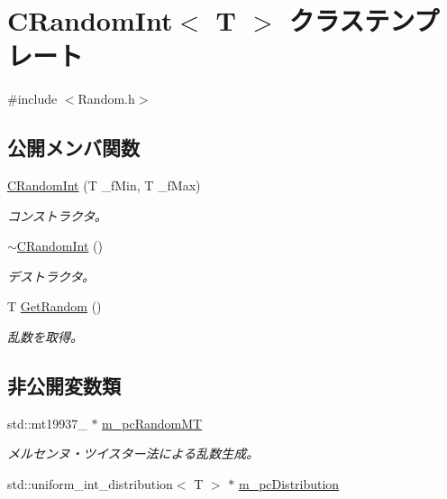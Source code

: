 \hypertarget{class_c_random_int}{}\section{C\+Random\+Int$<$ T $>$ クラステンプレート}
\label{class_c_random_int}


{\ttfamily \#include $<$Random.\+h$>$}

\subsection*{公開メンバ関数}
\begin{DoxyCompactItemize}
\item 
\hyperlink{class_c_random_int_a5f3ff4ea24378926da8aac150a4a33fd}{C\+Random\+Int} (T \+\_\+f\+Min, T \+\_\+f\+Max)
\begin{DoxyCompactList}\small\item\em コンストラクタ。 \end{DoxyCompactList}\item 
\hyperlink{class_c_random_int_a7cc41c7e1b21a16a8bfe3c79bb665e22}{$\sim$\+C\+Random\+Int} ()
\begin{DoxyCompactList}\small\item\em デストラクタ。 \end{DoxyCompactList}\item 
T \hyperlink{class_c_random_int_a04dfe95f084771d7c0392eef857f27ff}{Get\+Random} ()
\begin{DoxyCompactList}\small\item\em 乱数を取得。 \end{DoxyCompactList}\end{DoxyCompactItemize}
\subsection*{非公開変数類}
\begin{DoxyCompactItemize}
\item 
std\+::mt19937\+\_ $\ast$ \hyperlink{class_c_random_int_aae181316633165d9888d530e15f8232b}{m\+\_\+pc\+Random\+M\+T}
\begin{DoxyCompactList}\small\item\em メルセンヌ・ツイスター法による乱数生成。 \end{DoxyCompactList}\item 
std\+::uniform\+\_\+int\+\_\+distribution$<$ T $>$ $\ast$ \hyperlink{class_c_random_int_a5c6565335676d670c0072236d18e34cc}{m\+\_\+pc\+Distribution}
\end{DoxyCompactItemize}


